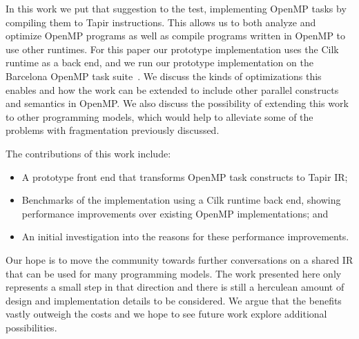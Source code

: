 \documentclass[sigconf]{acmart}
\begin{document}
In this work we put that suggestion to the test, implementing OpenMP tasks by
compiling them to Tapir instructions. This allows us to both analyze and optimize
OpenMP programs as well as compile programs written in OpenMP to use other runtimes.
For this paper our prototype implementation uses the Cilk runtime as a back end,
and we run our prototype implementation on the Barcelona OpenMP task
suite~\cite{barcelona}.  We discuss the kinds of optimizations this enables and
how the work can be extended to include other parallel constructs and semantics
in OpenMP. We also discuss the possibility of extending this work to other
programming models, which would help to alleviate some of the problems with
fragmentation previously discussed.

The contributions of this work include:
\begin{itemize}
  \item A prototype front end that transforms OpenMP task constructs to Tapir IR;
  \item Benchmarks of the implementation using a Cilk runtime back end, showing
        performance improvements over existing OpenMP implementations; and
  \item An initial investigation into the reasons for these performance improvements.
\end{itemize}
Our hope is to move the community towards further conversations on a
shared IR that can be used for many programming models. The work presented here only
represents a small step in that direction and there is still a herculean amount
of design and implementation details to be considered. We argue that the benefits vastly outweigh
the costs and we hope to see future work explore additional possibilities.

\end{document}
